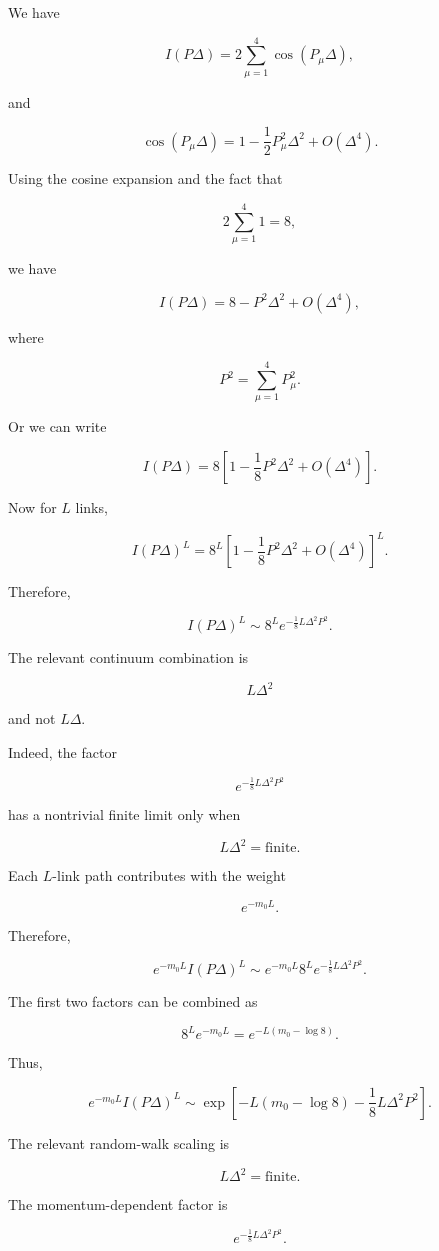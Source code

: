 \documentclass[12pt]{article}
\begin{document}
We have

\[
I(P\Delta)
=
2\sum_{\mu=1}^{4}
\cos(P_\mu\Delta),
\]

and

\[
\cos(P_\mu\Delta)
=
1-\frac12P_\mu^2\Delta^2
+
O(\Delta^4).
\]

Using the cosine expansion and the fact that

\[
2\sum_{\mu=1}^{4}1=8,
\]

we have

\[
I(P\Delta)
=
8-P^2\Delta^2+O(\Delta^4),
\]

where

\[
P^2
=
\sum_{\mu=1}^{4}P_\mu^2.
\]

Or we can write

\[
I(P\Delta)
=
8
\left[
1-\frac18P^2\Delta^2
+
O(\Delta^4)
\right].
\]

Now for $L$ links,

\[
I(P\Delta)^L
=
8^L
\left[
1-\frac18P^2\Delta^2
+
O(\Delta^4)
\right]^L.
\]

Therefore,

\[
\boxed{
I(P\Delta)^L
\sim
8^L
e^{-\frac18L\Delta^2P^2}.
}
\]

The relevant continuum combination is

\[
L\Delta^2
\]

and not $L\Delta$.

Indeed, the factor

\[
e^{-\frac18L\Delta^2P^2}
\]

has a nontrivial finite limit only when

\[
\boxed{
L\Delta^2=\text{finite}.
}
\]

Each $L$-link path contributes with the weight

\[
e^{-m_0L}.
\]

Therefore,

\[
e^{-m_0L}I(P\Delta)^L
\sim
e^{-m_0L}
8^L
e^{-\frac18L\Delta^2P^2}.
\]

The first two factors can be combined as

\[
8^Le^{-m_0L}
=
e^{-L(m_0-\log8)}.
\]

Thus,

\[
e^{-m_0L}I(P\Delta)^L
\sim
\exp\left[
-L(m_0-\log 8)
-\frac18L\Delta^2P^2
\right].
\]

The relevant random-walk scaling is

\[
L\Delta^2=\text{finite}.
\]

The momentum-dependent factor is

\[
e^{-\frac18L\Delta^2P^2}.
\]
\end{document}
